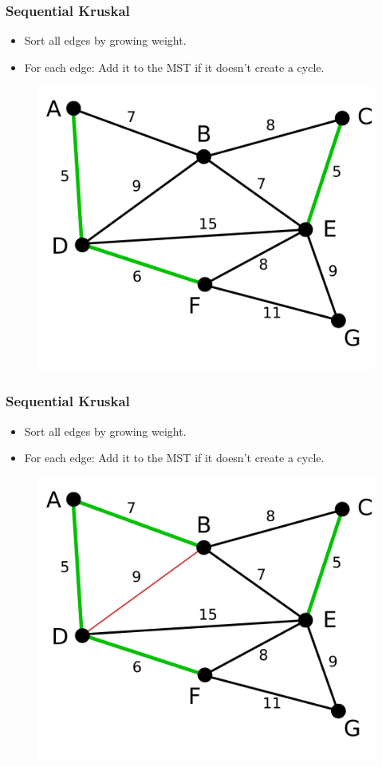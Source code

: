 \documentclass{beamer}
\begin{document}
\begin{frame}
    \frametitle{Sequential Kruskal}
    \begin{itemize}
        \item Sort all edges by growing weight.
        \item For each edge: Add it to the MST if it doesn't create a cycle.
    \end{itemize}

    \begin{figure}
        \includegraphics[width=.5\textwidth]{kruskal_3.png}
    \end{figure}

\end{frame}


\begin{frame}
    \frametitle{Sequential Kruskal}
    \begin{itemize}
        \item Sort all edges by growing weight.
        \item For each edge: Add it to the MST if it doesn't create a cycle.
    \end{itemize}

    \begin{figure}
        \includegraphics[width=.5\textwidth]{kruskal_4.png}
    \end{figure}

\end{frame}
\end{document}
